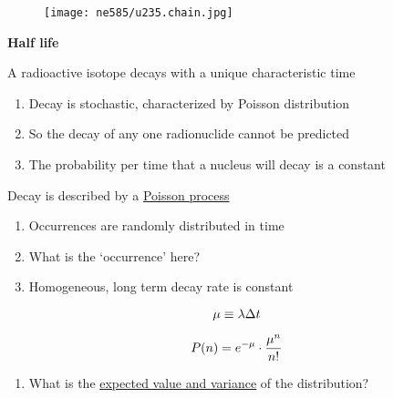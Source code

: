 \documentclass[aspectratio=1610,pdftex,dvipsnames,compress,xcolor={dvipsnames}]{beamer}
\begin{document}
\begin{frame}{}
    \begin{figure}
        \centering
        \texttt{[image: ne585/u235.chain.jpg]}
    \end{figure}
\end{frame}


\begin{frame}[plain]{}
    \centering\LARGE\textbf{Half life}
\end{frame}


\addtocounter{framenumber}{-1}
\begin{frame}{A radioactive isotope decays with a unique characteristic time}
    \begin{enumerate}[series=outerlist,topsep=0pt,itemsep=21pt,leftmargin=*,label=(\arabic*)]
        \item[]Decay is stochastic, characterized by Poisson distribution
        \item[]So the decay of any one radionuclide cannot be predicted
        \item[]The probability per time that a nucleus will decay is a constant
    \end{enumerate}
\end{frame}


\begin{frame}{Decay is described by a \href{https://stattrek.com/probability-distributions/poisson.aspx}{Poisson process}}
    \begin{enumerate}[series=outerlist,topsep=0pt,itemsep=21pt,leftmargin=*,label=(\arabic*)]
        \item[]Occurrences are randomly distributed in time
        \item[]What is the `occurrence' here?
        \item[]Homogeneous, long term decay rate is constant
    \end{enumerate}

    \vspace*{\fill}

    \begin{equation}
        \LARGE
        \mu \equiv \lambda \Delta t
    \end{equation}

    \begin{equation}
        \LARGE
        P(n) = e^{-\mu} \cdot \frac{\mu^n}{n!}
    \end{equation}

    \vspace*{\fill}

    \begin{enumerate}[series=outerlist,topsep=0pt,itemsep=21pt,leftmargin=*,label=(\arabic*)]
        \item[]What is the \href{https://uidaho.pressbooks.pub/riskassessment/chapter/statistical-moments/}{expected value and variance} of the distribution?
    \end{enumerate}
\end{frame}
\end{document}
